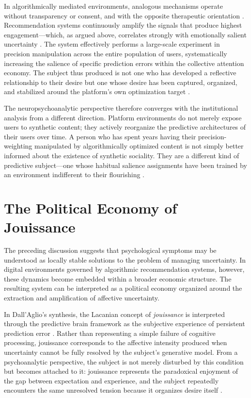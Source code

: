 \documentclass[12pt,a4paper]{article}
\begin{document}
In algorithmically mediated environments, analogous mechanisms operate without transparency or
consent, and with the opposite therapeutic orientation \citep{zuboff2019}. Recommendation systems
continuously amplify the signals that produce highest engagement---which, as argued above,
correlates strongly with emotionally salient uncertainty \citep{vosoughi2018}. The system
effectively performs a large-scale experiment in precision manipulation across the entire
population of users, systematically increasing the salience of specific prediction errors within
the collective attention economy. The subject thus produced is not one who has developed a
reflective relationship to their desire but one whose desire has been captured, organized, and
stabilized around the platform's own optimization target \citep{zuboff2019,dallaglio2024}.

The neuropsychoanalytic perspective therefore converges with the institutional analysis from a
different direction. Platform environments do not merely expose users to synthetic content; they
actively reorganize the predictive architectures of their users over time. A person who has
spent years having their precision-weighting manipulated by algorithmically optimized content is
not simply better informed about the existence of synthetic sociality. They are a different kind
of predictive subject---one whose habitual salience assignments have been trained by an environment
indifferent to their flourishing \citep{solms2021,dallaglio2024}.

\section{The Political Economy of Jouissance}

The preceding discussion suggests that psychological symptoms may be understood as locally
stable solutions to the problem of managing uncertainty. In digital environments governed by
algorithmic recommendation systems, however, these dynamics become embedded within a broader
economic structure. The resulting system can be interpreted as a political economy organized
around the extraction and amplification of affective uncertainty.

In Dall'Aglio's synthesis, the Lacanian concept of \emph{jouissance} is interpreted through
the predictive brain framework as the subjective experience of persistent prediction error
\citep{dallaglio2024}. Rather than representing a simple failure of cognitive processing,
jouissance corresponds to the affective intensity produced when uncertainty cannot be fully
resolved by the subject's generative model. From a psychoanalytic perspective, the subject is
not merely disturbed by this condition but becomes attached to it: jouissance represents the
paradoxical enjoyment of the gap between expectation and experience, and the subject repeatedly
encounters the same unresolved tension because it organizes desire itself \citep{lacan2006}.
\end{document}
